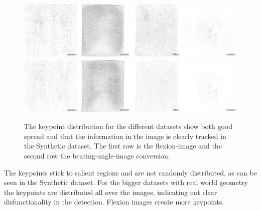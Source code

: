 \begin{figure}[H]
    \includegraphics[width=\linewidth]{chapter06/results/SIFT/flexion/distribution.pdf}\\
    \includegraphics[width=\linewidth]{chapter06/results/SIFT/bearing/distribution.pdf}%
    \caption{The keypoint distribution for the different datasets show both good spread and that the information in the image is clearly tracked in the Synthetic dataset. The first row is the \gls{flexion-image} and the second row the \gls{bearing-angle-image} conversion.}
\end{figure}
The keypoints stick to salient regions and are not randomly distributed, as can be seen in the Synthetic dataset.
For the bigger datasets with real world geometry the keypoints are distributed all over the images, indicating not clear disfunctionality in the detection.
Flexion images create more keypoints.


